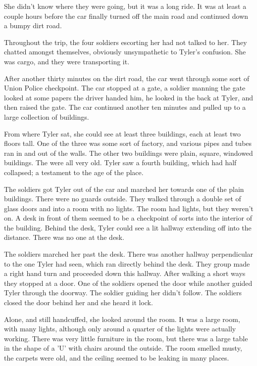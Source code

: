 \documentclass[courier]{sffms}
\begin{document}
She didn't know where they were going, but it was a
long ride. It was at least a couple hours before the car
finally turned off the main road and continued down
a bumpy dirt road.

Throughout the trip, the four soldiers escorting her
had not talked to her. They chatted amongst themselves,
obviously unsympathetic to Tyler's confusion. She was
cargo, and they were transporting it.

After another thirty minutes on the dirt road, the car went
through some sort of Union Police checkpoint. The car
stopped at a gate, a soldier manning the gate looked at
some papers the driver handed him, he looked in the
back at Tyler, and then raised the gate. The car continued
another ten minutes and pulled up to a large collection
of buildings.

From where Tyler sat, she could see at least
three buildings, each at least two floors tall. One of the three
was some sort of factory, and various pipes and tubes
ran in and out of the walls. The other two buildings were
plain, square, windowed buildings. The were all very old.
Tyler saw a fourth building, which had half collapsed; a
testament to the age of the place.

The soldiers got Tyler out of the car and marched her
towards one of the plain buildings. There were no guards
outside. They walked through a double set of glass doors
and into a room with no lights. The room had lights,
but they weren't on. A desk in front of them seemed to
be a checkpoint of sorts into the interior of the building.
Behind the desk, Tyler could see a lit hallway extending
off into the distance. There was no one at the desk.

The soldiers marched her past the desk. There was another
hallway perpendicular to the one Tyler had seen, which
ran directly behind the desk. They group made a right hand
turn and proceeded down this hallway. After walking a short
ways they stopped at a door. One of the soldiers opened
the door while another guided Tyler through the doorway.
The soldier guiding her didn't follow. The soldiers closed 
the door behind her and she heard it lock.

Alone, and still handcuffed, she looked around the room.
It was a large room, with many lights, although only around
a quarter of the lights were actually working. There
was very little furniture in the room, but there was a
large table in the shape of a 'U' with chairs around the
outside. The room smelled musty, the carpets were old,
and the ceiling seemed to be leaking in many places.
\end{document}
